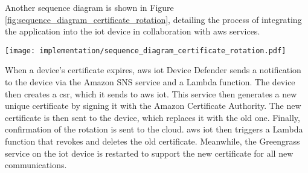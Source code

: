 Another sequence diagram is shown in Figure \ref{fig:sequence_diagram_certificate_rotation}, detailing the process of integrating the application into the \acrshort{iot} device in collaboration with \gls{aws} services.
\begin{center}
    \begingroup
    \texttt{[image: implementation/sequence\_diagram\_certificate\_rotation.pdf]}
    \label{fig:sequence_diagram_certificate_rotation}
    \endgroup
\end{center}
When a device's certificate expires, \gls{aws} \acrshort{iot} Device Defender sends a notification to the device via the Amazon SNS service and a Lambda function. The device then creates a \acrshort{csr}, which it sends to \gls{aws} \acrshort{iot}. This service then generates a new unique certificate by signing it with the Amazon Certificate Authority. The new certificate is then sent to the device, which replaces it with the old one. Finally, confirmation of the rotation is sent to the \gls{cloud}. \gls{aws} \acrshort{iot} then triggers a Lambda function that revokes and deletes the old certificate. Meanwhile, the Greengrass service on the \acrshort{iot} device is restarted to support the new certificate for all new communications.

